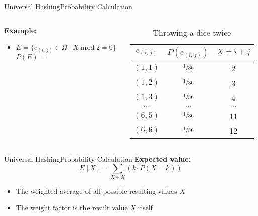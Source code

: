 \begin{frame}{Universal Hashing}{Probability Calculation}
  \begin{columns}
    \begin{column}{0.55\linewidth}
      \textbf{Example:}
      \begin{itemize}
        \item
          {\color{Mittel-Blau}$E = \{e_{(i,\,j)} \in \Omega
          \mid X \;\mathrm{mod}\; 2 = 0\}$}\\
          {\color{Mittel-Blau}$P(E) =$}
      \end{itemize}
    \end{column}
    \begin{column}{0.45\linewidth}
      \begin{table}[!h]
        \caption{Throwing a dice twice}
        \label{tab:probabilities:rolling_dice_twice3}
        \begin{tabularx}{0.95\linewidth}{c|cc}
          {\color{Mittel-Blau}$e_{(i,\,j)}$} & {\color{Mittel-Blau}$P(e_{(i,\,j)})$} &{\color{Mittel-Blau} $X = i + j$}\\
          \midrule
          $(1, 1)$ & $\sfrac{1}{36}$ & 2\\
          $(1, 2)$ & $\sfrac{1}{36}$ & 3\\
          $(1, 3)$ & $\sfrac{1}{36}$ & 4\\
          $\dots$ & $\dots$ & $\dots$\\
          $(6, 5)$ & $\sfrac{1}{36}$ & 11\\
          $(6, 6)$ & $\sfrac{1}{36}$ & 12\\
        \end{tabularx}
      \end{table}
    \end{column}
  \end{columns}
\end{frame}


\begin{frame}{Universal Hashing}{Probability Calculation}
  \textbf{Expected value:}
  {\color{Mittel-Blau}\[E[X]
    = \sum_{X \in X} \left(k \cdot P(X = k)\right)\]}
  \begin{itemize}
    \item
      The weighted average of all possible resulting values {\color{Mittel-Blau}$X$}
    \item
      The weight factor is the result value {\color{Mittel-Blau}$X$} itself
  \end{itemize}
\end{frame}

